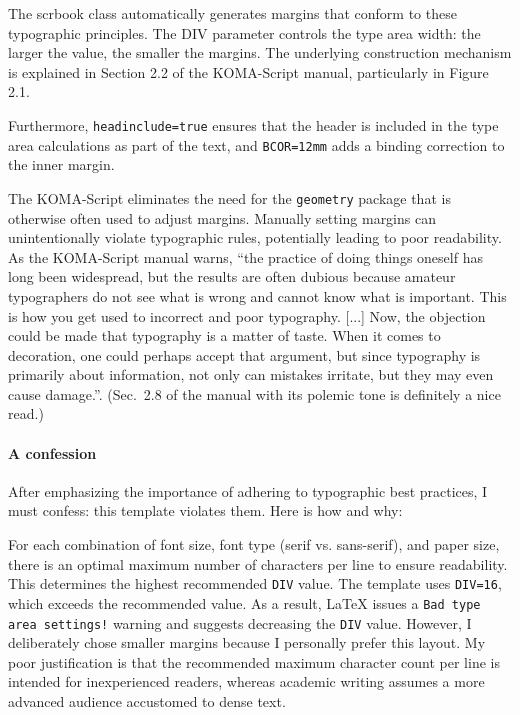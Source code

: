 The scrbook class automatically generates margins that conform to these typographic principles. The DIV parameter controls the type area width: the larger the value, the smaller the margins. The underlying construction mechanism is explained in Section 2.2 of the KOMA-Script manual, particularly in Figure 2.1.

Furthermore, \verb|headinclude=true| ensures that the header is included in the type area calculations as part of the text, and \verb|BCOR=12mm| adds a binding correction to the inner margin.

The KOMA-Script eliminates the need for the \verb|geometry| package that is otherwise often used to adjust margins. Manually setting margins can unintentionally violate typographic rules, potentially leading to poor readability. As the KOMA-Script manual warns, ``the practice of doing things oneself has long been widespread, but the results are often dubious because amateur typographers do not see what is wrong and cannot know what is important. This is how you get used to incorrect and poor typography. [...] Now, the objection could be made that typography is a matter of taste. When it comes to decoration, one could perhaps accept that argument, but since typography is primarily about information, not only can mistakes irritate, but they may even cause damage.''\cite{koma_manual, willberg2000}. (Sec.~2.8 of the manual with its polemic tone is definitely a nice read.)

\paragraph{A confession} After emphasizing the importance of adhering to typographic best practices, I must confess: this template violates them. Here is how and why:

For each combination of font size, font type (serif vs. sans-serif), and paper size, there is an optimal maximum number of characters per line to ensure readability. This determines the highest recommended \verb|DIV| value. The template uses \verb|DIV=16|, which exceeds the recommended value. As a result, LaTeX issues a \verb|Bad type area settings!| warning and suggests decreasing the \verb|DIV| value.
However, I deliberately chose smaller margins because I personally prefer this layout. My poor justification is that the recommended maximum character count per line is intended for inexperienced readers, whereas academic writing assumes a more advanced audience accustomed to dense text.



